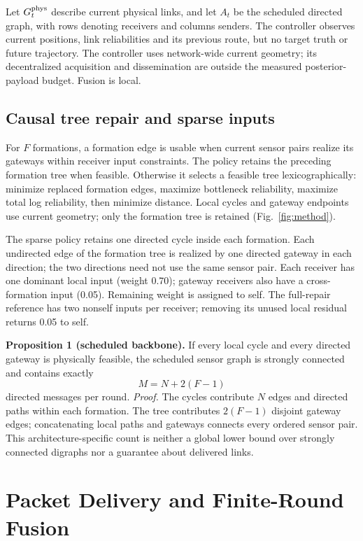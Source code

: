 \documentclass{article}
\begin{document}
Let $G_t^{\rm phys}$ describe current physical links, and let $A_t$ be the
scheduled directed graph, with rows denoting receivers and columns senders.
The controller observes current positions, link reliabilities and its
previous route, but no target truth or future trajectory. The controller
uses network-wide current geometry; its decentralized acquisition and
dissemination are outside the measured posterior-payload budget. Fusion is local.

\subsection{Causal tree repair and sparse inputs}
For $F$ formations, a formation edge is usable when current sensor pairs
realize its gateways within receiver input constraints. The policy retains
the preceding formation tree when feasible. Otherwise it selects a feasible
tree lexicographically: minimize replaced formation edges, maximize bottleneck
reliability, maximize total log reliability, then minimize distance. Local
cycles and gateway endpoints use current geometry; only the formation tree
is retained (Fig.~\ref{fig:method}).

The sparse policy retains one directed cycle inside each formation. Each
undirected edge of the formation tree is realized by one directed gateway
in each direction; the two directions need not use the same sensor pair.
Each receiver has one dominant local input (weight 0.70); gateway receivers
also have a cross-formation input (0.05). Remaining weight is assigned to
self. The full-repair reference has two nonself inputs per receiver;
removing its unused local residual returns 0.05 to self.

\noindent\textbf{Proposition 1 (scheduled backbone).}
If every local cycle and every directed gateway is physically feasible,
the scheduled sensor graph is strongly connected and contains exactly
\begin{equation}M=N+2(F-1)\label{eq:messages}\end{equation}
directed messages per round.
\emph{Proof.} The cycles contribute $N$ edges and directed paths within
each formation. The tree contributes $2(F-1)$ disjoint gateway edges;
concatenating local paths and gateways connects every ordered sensor pair.
This architecture-specific count is neither a global lower bound over
strongly connected digraphs nor a guarantee about delivered links.

\section{Packet Delivery and Finite-Round Fusion}
\end{document}
